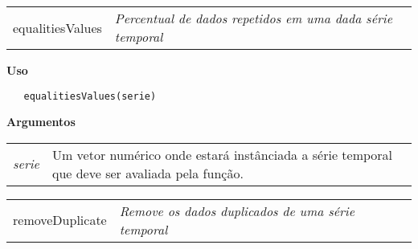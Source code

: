 \documentclass[12pt,letterpaper]{article}
\begin{document}
\hrulefill   

\begin{table}[!h]
\begin{center}
\begin{tabularx}{\textwidth}{ X X}
\hspace{0.5cm} equalitiesValues & \textit{Percentual de dados repetidos em uma dada série temporal}\\
\end{tabularx}
\end{center}
\end{table} 

\vspace{-0.5cm}

\hrulefill  

\vspace{0.5cm}

\textbf{Uso}

\begin{lstlisting}
   equalitiesValues(serie)
\end{lstlisting}

\vspace{0.5cm}

\textbf{Argumentos}

\begin{table}[!h]
\begin{center}
\begin{tabularx}{\textwidth}{X X}
\hspace{0.5cm} \textit{serie} & Um vetor numérico onde estará instânciada a série temporal que deve ser avaliada pela função.\\
\end{tabularx}
\end{center}
\end{table} 

\newpage


\hrulefill   

\begin{table}[!h]
\begin{center}
\begin{tabularx}{\textwidth}{X X}
\hspace{0.5cm} removeDuplicate & \textit{Remove os dados duplicados de uma série temporal}\\
\end{tabularx}
\end{center}
\end{table} 
\end{document}
